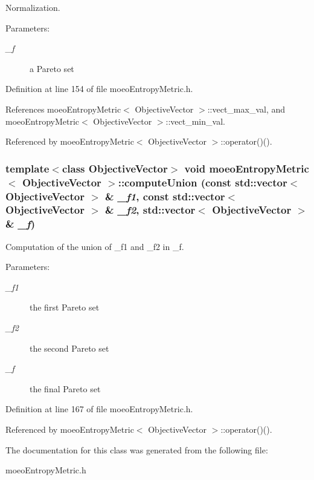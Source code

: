 Normalization. 

\begin{Desc}
\item[Parameters:]
\begin{description}
\item[{\em \_\-f}]a Pareto set \end{description}
\end{Desc}


Definition at line 154 of file moeo\-Entropy\-Metric.h.

References moeo\-Entropy\-Metric$<$ Objective\-Vector $>$::vect\_\-max\_\-val, and moeo\-Entropy\-Metric$<$ Objective\-Vector $>$::vect\_\-min\_\-val.

Referenced by moeo\-Entropy\-Metric$<$ Objective\-Vector $>$::operator()().
\subsubsection{\setlength{\rightskip}{0pt plus 5cm}template$<$class Objective\-Vector$>$ void \bf{moeo\-Entropy\-Metric}$<$ Objective\-Vector $>$::compute\-Union (const std::vector$<$ Objective\-Vector $>$ \& {\em \_\-f1}, const std::vector$<$ Objective\-Vector $>$ \& {\em \_\-f2}, std::vector$<$ Objective\-Vector $>$ \& {\em \_\-f})\hspace{0.3cm}{\tt  [inline, private]}}\label{classmoeoEntropyMetric_4b99c1842d780a89bda08e99a59e3e29}


Computation of the union of \_\-f1 and \_\-f2 in \_\-f. 

\begin{Desc}
\item[Parameters:]
\begin{description}
\item[{\em \_\-f1}]the first Pareto set \item[{\em \_\-f2}]the second Pareto set \item[{\em \_\-f}]the final Pareto set \end{description}
\end{Desc}


Definition at line 167 of file moeo\-Entropy\-Metric.h.

Referenced by moeo\-Entropy\-Metric$<$ Objective\-Vector $>$::operator()().

The documentation for this class was generated from the following file:\begin{CompactItemize}
\item 
moeo\-Entropy\-Metric.h\end{CompactItemize}
